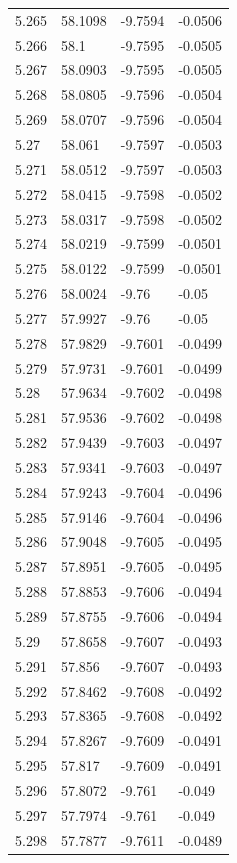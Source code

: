 \begin{tabular}{llll}
5.265 & 58.1098 & -9.7594 & -0.0506 \\
5.266 & 58.1 & -9.7595 & -0.0505 \\
5.267 & 58.0903 & -9.7595 & -0.0505 \\
5.268 & 58.0805 & -9.7596 & -0.0504 \\
5.269 & 58.0707 & -9.7596 & -0.0504 \\
5.27 & 58.061 & -9.7597 & -0.0503 \\
5.271 & 58.0512 & -9.7597 & -0.0503 \\
5.272 & 58.0415 & -9.7598 & -0.0502 \\
5.273 & 58.0317 & -9.7598 & -0.0502 \\
5.274 & 58.0219 & -9.7599 & -0.0501 \\
5.275 & 58.0122 & -9.7599 & -0.0501 \\
5.276 & 58.0024 & -9.76 & -0.05 \\
5.277 & 57.9927 & -9.76 & -0.05 \\
5.278 & 57.9829 & -9.7601 & -0.0499 \\
5.279 & 57.9731 & -9.7601 & -0.0499 \\
5.28 & 57.9634 & -9.7602 & -0.0498 \\
5.281 & 57.9536 & -9.7602 & -0.0498 \\
5.282 & 57.9439 & -9.7603 & -0.0497 \\
5.283 & 57.9341 & -9.7603 & -0.0497 \\
5.284 & 57.9243 & -9.7604 & -0.0496 \\
5.285 & 57.9146 & -9.7604 & -0.0496 \\
5.286 & 57.9048 & -9.7605 & -0.0495 \\
5.287 & 57.8951 & -9.7605 & -0.0495 \\
5.288 & 57.8853 & -9.7606 & -0.0494 \\
5.289 & 57.8755 & -9.7606 & -0.0494 \\
5.29 & 57.8658 & -9.7607 & -0.0493 \\
5.291 & 57.856 & -9.7607 & -0.0493 \\
5.292 & 57.8462 & -9.7608 & -0.0492 \\
5.293 & 57.8365 & -9.7608 & -0.0492 \\
5.294 & 57.8267 & -9.7609 & -0.0491 \\
5.295 & 57.817 & -9.7609 & -0.0491 \\
5.296 & 57.8072 & -9.761 & -0.049 \\
5.297 & 57.7974 & -9.761 & -0.049 \\
5.298 & 57.7877 & -9.7611 & -0.0489 \\

\end{tabular}
